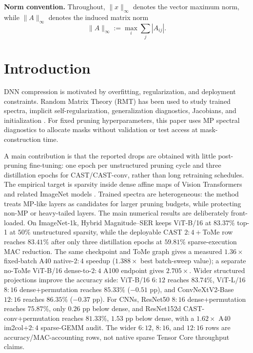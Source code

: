 \documentclass[11pt]{article}
\theoremstyle{plain}
\theoremstyle{definition}
\theoremstyle{remark}
\newcommand{\1}{\mathbf{1}}
\begin{document}
\noindent\textbf{Norm convention.}
Throughout, \(\|x\|_\infty\) denotes the vector maximum norm, while \(\|A\|_\infty\) denotes the induced matrix norm
\[
\|A\|_\infty:=\max_i\sum_j |A_{ij}|.
\]

\section{Introduction}

DNN compression is motivated by overfitting, regularization, and deployment constraints. Random Matrix Theory (RMT) has been used to study trained spectra, implicit self-regularization, generalization diagnostics, Jacobians, and initialization \cite{martin2021implicit,mahoney2019traditional,meng2023impact,xiao2023heavy,thamm2022random,pastur2020random,pastur2023random,saada2023initialisation,martin2021predicting,martin2020heavy}. For fixed pruning hyperparameters, this paper uses MP spectral diagnostics to allocate masks without validation or test access at mask-construction time.

A main contribution is that the reported drops are obtained with little post-pruning fine-tuning: one epoch per unstructured pruning cycle and three distillation epochs for CAST/CAST-conv, rather than long retraining schedules. The empirical target is sparsity inside dense affine maps of Vision Transformers and related ImageNet models \cite{dosovitskiy2021image,vaswani2017attention}. Trained spectra are heterogeneous: the method treats MP-like layers as candidates for larger pruning budgets, while protecting non-MP or heavy-tailed layers. The main numerical results are deliberately front-loaded. On ImageNet-1k, Hybrid Magnitude--SER keeps ViT-B/16 at \(83.37\%\) top-1 at \(50\%\) unstructured sparsity, while the deployable CAST \(2{:}4{+}\)ToMe row reaches \(83.41\%\) after only three distillation epochs at \(59.81\%\) sparse-execution MAC reduction. The same checkpoint and ToMe graph gives a measured \(1.36\times\) fixed-batch A40 native-\(2{:}4\) speedup (\(1.388\times\) best batch-sweep value); a separate no-ToMe ViT-B/16 dense-to-\(2{:}4\) A100 endpoint gives \(2.705\times\). Wider structured projections improve the accuracy side: ViT-B/16 \(6{:}12\) reaches \(83.74\%\), ViT-L/16 \(8{:}16\) dense+permutation reaches \(85.33\%\) (\(-0.51\) pp), and ConvNeXtV2-Base \(12{:}16\) reaches \(86.35\%\) (\(-0.37\) pp). For CNNs, ResNet50 \(8{:}16\) dense+permutation reaches \(75.87\%\), only \(0.26\) pp below dense, and ResNet152d CAST-conv+permutation reaches \(81.33\%\), \(1.53\) pp below dense, with a \(1.62\times\) A40 im2col+\(2{:}4\) sparse-GEMM audit. The wider \(6{:}12\), \(8{:}16\), and \(12{:}16\) rows are accuracy/MAC-accounting rows, not native sparse Tensor Core throughput claims.
\end{document}
